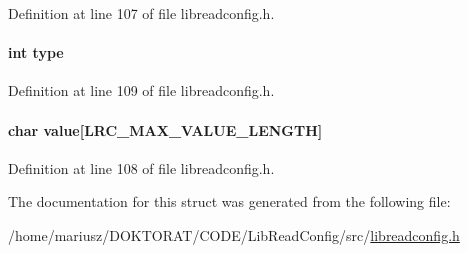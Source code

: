 Definition at line 107 of file libreadconfig.h.\hypertarget{struct_l_r_c__config_options_c765329451135abec74c45e1897abf26}{
\paragraph[{type}]{\setlength{\rightskip}{0pt plus 5cm}int {\bf type}}\hfill}
\label{struct_l_r_c__config_options_c765329451135abec74c45e1897abf26}




Definition at line 109 of file libreadconfig.h.\hypertarget{struct_l_r_c__config_options_643773f9f784c3c583c832c216ba32c9}{
\paragraph[{value}]{\setlength{\rightskip}{0pt plus 5cm}char {\bf value}\mbox{[}LRC\_\-MAX\_\-VALUE\_\-LENGTH\mbox{]}}\hfill}
\label{struct_l_r_c__config_options_643773f9f784c3c583c832c216ba32c9}




Definition at line 108 of file libreadconfig.h.

The documentation for this struct was generated from the following file:\begin{CompactItemize}
\item 
/home/mariusz/DOKTORAT/CODE/LibReadConfig/src/\hyperlink{libreadconfig_8h}{libreadconfig.h}\end{CompactItemize}
